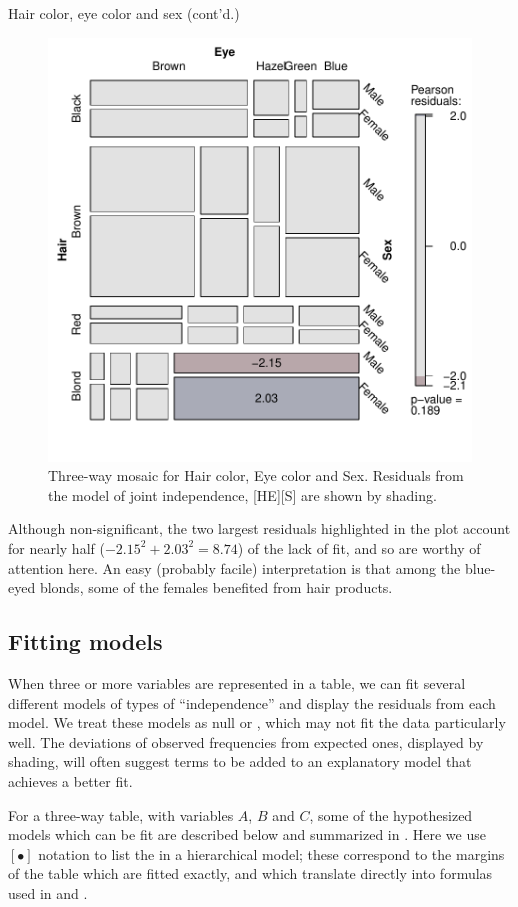 \documentclass[10pt,krantz2]{krantz}\usepackage[]{graphicx}\usepackage[]{color}
\newenvironment{knitrout}{}{} %
\renewenvironment{knitrout}{\small\renewcommand{\baselinestretch}{.85}}{} %
\begin{document}
\begin{Example}[HEC2]{Hair color, eye color and sex (cont'd.)}
\begin{knitrout}
\begin{figure}[!htb]
\centerline{\includegraphics[width=.7\textwidth]{ch05/fig/HEC-mos1-1} }

\caption[Three-way mosaic for Hair color, Eye color and Sex]{Three-way mosaic for Hair color, Eye color and Sex. Residuals from the model of joint independence, [HE][S] are shown by shading.\label{fig:HEC-mos1}}
\end{figure}


\end{knitrout}
Although non-significant, the two largest residuals
highlighted in the plot account for nearly half
($-2.15^2 + 2.03^2 = 8.74$) of the lack of fit, and so are worthy
of attention here.  An easy (probably facile) interpretation is
that among the blue-eyed blonds, some of the females benefited from
hair products.
\end{Example}

\subsection{Fitting models}\label{sec:mosaic-fitting}
When three or more variables are
represented in a table, we can fit several different models of types of
``independence'' and display the residuals from each model.  We treat
these models as null or , which may not fit the data
particularly well.  The deviations of observed frequencies from
expected ones, displayed by shading, will often suggest terms to be added
to an explanatory model that achieves a better fit.

For a three-way table, with variables $A$, $B$ and $C$, some of the hypothesized models which can be fit are
described below and summarized in .
Here we use $[\bullet]$ notation to list the  in
a hierarchical \loglin model; these correspond to the margins
of the table which are fitted exactly, and which translate
directly into \R formulas used in  and
.
\end{document}
